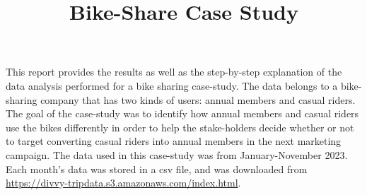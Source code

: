 \documentclass[12pt]{article}
\begin{document}
\title{Bike-Share Case Study}
\date{}
\maketitle

This report provides the results as well as the step-by-step explanation of the data analysis performed for a bike sharing case-study. The data belongs to a bike-sharing company that has two kinds of users: annual members and casual riders. The goal of the case-study was to identify how annual members and casual riders use the bikes differently in order to help the stake-holders decide whether or not to target converting casual riders into annual members in the next marketing campaign. The data used in this case-study was from January-November 2023. Each month's data was stored in a csv file, and was downloaded from \url{https://divvy-tripdata.s3.amazonaws.com/index.html}. 
\end{document}
